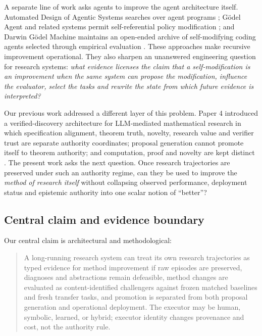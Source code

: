 A separate line of work asks agents to improve the agent architecture itself. Automated Design of Agentic Systems searches over agent programs \cite{hu2024adas}; G\"odel Agent and related systems permit self-referential policy modification \cite{yin2024godelagent}; and Darwin G\"odel Machine maintains an open-ended archive of self-modifying coding agents selected through empirical evaluation \cite{zhang2025dgm}. These approaches make recursive improvement operational. They also sharpen an unanswered engineering question for research systems: \emph{what evidence licenses the claim that a self-modification is an improvement when the same system can propose the modification, influence the evaluator, select the tasks and rewrite the state from which future evidence is interpreted?}

Our previous \RAKL{} work addressed a different layer of this problem. Paper 4 introduced a verified-discovery architecture for LLM-mediated mathematical research in which specification alignment, theorem truth, novelty, research value and verifier trust are separate authority coordinates; proposal generation cannot promote itself to theorem authority; and computation, proof and novelty are kept distinct \cite{yiu2026verified}. The present work asks the next question. Once research trajectories are preserved under such an authority regime, can they be used to improve the \emph{method of research itself} without collapsing observed performance, deployment status and epistemic authority into one scalar notion of ``better''?

\subsection{Central claim and evidence boundary}

Our central claim is architectural and methodological:

\begin{quote}
A long-running research system can treat its own research trajectories as typed evidence for method improvement if raw episodes are preserved, diagnoses and abstractions remain defeasible, method changes are evaluated as content-identified challengers against frozen matched baselines and fresh transfer tasks, and promotion is separated from both proposal generation and operational deployment. The executor may be human, symbolic, learned, or hybrid; executor identity changes provenance and cost, not the authority rule.
\end{quote}

